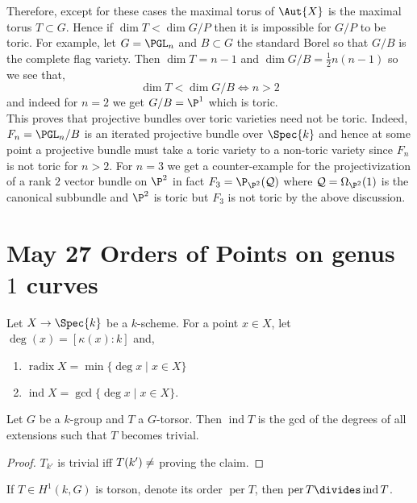 \documentclass[12pt]{article}
\begin{document}
Therefore, except for these cases the maximal torus of $\Aut{X}$ is the maximal torus $T \subset G$. Hence if $\dim{T} < \dim{G/P}$ then it is impossible for $G/P$ to be toric. For example, let $G = \PGL_n$ and $B \subset G$ the standard Borel so that $G/B$ is the complete flag variety. Then $\dim{T} = n-1$ and $\dim{G/B} = \tfrac{1}{2} n(n-1)$ so we see that,
\[ \dim{T} < \dim{G/B} \iff n > 2 \]
and indeed for $n = 2$ we get $G/B = \P^1$ which is toric.  
\bigskip\\
This proves that projective bundles over toric varieties need not be toric. Indeed, $F_n = \PGL_n / B$ is an iterated projective bundle over $\Spec{k}$ and hence at some point a projective bundle must take a toric variety to a non-toric variety since $F_n$ is not toric for $n > 2$. For $n = 3$ we get a counter-example for the projectivization of a rank $2$ vector bundle on $\P^2$ in fact $F_3 = \P_{\P^2}(\mathcal{Q})$ where $\mathcal{Q} = \Omega_{\P^2}(1)$ is the canonical subbundle and $\P^2$ is toric but $F_3$ is not toric by the above discussion. 

\section{May 27 Orders of Points on genus $1$ curves}

\newcommand{\ind}{\operatorname{ind}}
\newcommand{\radix}{\operatorname{radix}}
\newcommand{\per}{\operatorname{per}}

\begin{defn}
Let $X \to \Spec{k}$ be a $k$-scheme. For a point $x \in X$, let $\deg(x) = [\kappa(x) : k]$ and,
\begin{enumerate}
\item $\radix{X} = \min \{ \deg{x} \mid x \in X \}$
\item $\ind{X} = \gcd \{ \deg{x} \mid x \in X \}$.
\end{enumerate}
\end{defn}

\begin{prop}
Let $G$ be a $k$-group and $T$ a $G$-torsor. Then $\ind{T}$ is the gcd of the degrees of all extensions such that $T$ becomes trivial.
\end{prop}

\begin{proof}
$T_{k'}$ is trivial iff $T(k') \neq \empty$ proving the claim. 
\end{proof}

\begin{prop}
If $T \in H^1(k, G)$ is torson, denote its order $\per{T}$, then $\per{T} \divides \ind{T}$.
\end{prop}
\end{document}
